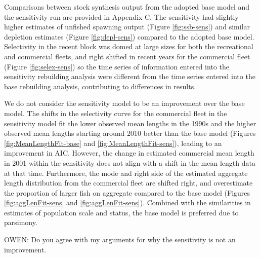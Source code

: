 \documentclass[11pt,
  english,
  a4paper,
]{article}
\begin{document}

Comparisons between stock synthesis output from the adopted base model and the sensitivity run are provided in \protect\hypertarget{append_c}{}{Appendix C}. The sensitivity had slightly higher estimates of unfished spawning output (Figure \ref{fig:ssb-sens}) and similar depletion estimates (Figure \ref{fig:depl-sens}) compared to the adopted base model. Selectivity in the recent block was domed at large sizes for both the recreational and commercial fleets, and right shifted in recent years for the commercial fleet (Figure \ref{fig:selex-sens}) so the time series of information entered into the sensitivity rebuilding analysis were different from the time series entered into the base rebuilding analysis, contributing to differences in results.

\leavevmode\tagmcend\tagstructend\par


We do not consider the sensitivity model to be an improvement over the base model. The shifts in the selectivity curve for the commercial fleet in the sensitivity model fit the lower observed mean lengths in the 1990s and the higher observed mean lengths starting around 2010 better than the base model (Figures \ref{fig:MeanLengthFit-base} and \ref{fig:MeanLengthFit-sens}), leading to an improvement in AIC. However, the change in estimated commercial mean length in 2001 within the sensitivity does not align with a shift in the mean length data at that time. Furthermore, the mode and right side of the estimated aggregate length distribution from the commercial fleet are shifted right, and overestimate the proportion of larger fish on aggregate compared to the base model (Figures \ref{fig:aggLenFit-sens} and \ref{fig:aggLenFit-sens}). Combined with the similarities in estimates of population scale and status, the base model is preferred due to parsimony.

\leavevmode\tagmcend\tagstructend\par


OWEN: Do you agree with my arguments for why the sensitivity is not an improvement.

\leavevmode\tagmcend\tagstructend\par

\end{document}
